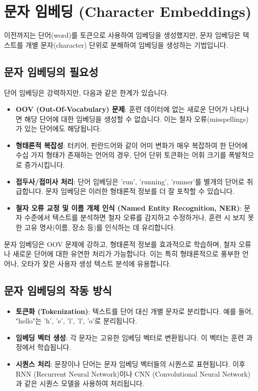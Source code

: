 \documentclass[11pt,a4paper]{article}
\begin{document}
\section{문자 임베딩 (Character Embeddings)}
이전까지는 단어(word)를 토큰으로 사용하여 임베딩을 생성했지만, 문자 임베딩은 텍스트를 개별 문자(character) 단위로 분해하여 임베딩을 생성하는 기법입니다.

\subsection{문자 임베딩의 필요성}
단어 임베딩은 강력하지만, 다음과 같은 한계가 있습니다.

\begin{itemize}
    \item \textbf{OOV (Out-Of-Vocabulary) 문제}: 훈련 데이터에 없는 새로운 단어가 나타나면 해당 단어에 대한 임베딩을 생성할 수 없습니다. 이는 철자 오류(misspellings)가 있는 단어에도 해당됩니다.
    \item \textbf{형태론적 복잡성}: 터키어, 핀란드어와 같이 어미 변화가 매우 복잡하여 한 단어에 수십 가지 형태가 존재하는 언어의 경우, 단어 단위 토큰화는 어휘 크기를 폭발적으로 증가시킵니다.
    \item \textbf{접두사/접미사 처리}: 단어 임베딩은 'run', 'running', 'runner'를 별개의 단어로 취급합니다. 문자 임베딩은 이러한 형태론적 정보를 더 잘 포착할 수 있습니다.
    \item \textbf{철자 오류 교정 및 이름 개체 인식 (Named Entity Recognition, NER)}: 문자 수준에서 텍스트를 분석하면 철자 오류를 감지하고 수정하거나, 훈련 시 보지 못한 고유 명사(이름, 장소 등)를 인식하는 데 유리합니다.
\end{itemize}

\begin{tcolorbox}[title=\textbf{문자 임베딩의 장점}]
문자 임베딩은 OOV 문제에 강하고, 형태론적 정보를 효과적으로 학습하며, 철자 오류나 새로운 단어에 대한 유연한 처리가 가능합니다. 이는 특히 형태론적으로 풍부한 언어나, 오타가 잦은 사용자 생성 텍스트 분석에 유용합니다.
\end{tcolorbox}

\subsection{문자 임베딩의 작동 방식}
\begin{itemize}
    \item \textbf{토큰화 (Tokenization)}: 텍스트를 단어 대신 개별 문자로 분리합니다. 예를 들어, "hello"는 'h', 'e', 'l', 'l', 'o'로 분리됩니다.
    \item \textbf{임베딩 벡터 생성}: 각 문자는 고유한 임베딩 벡터로 변환됩니다. 이 벡터는 훈련 과정에서 학습됩니다.
    \item \textbf{시퀀스 처리}: 문장이나 단어는 문자 임베딩 벡터들의 시퀀스로 표현됩니다. 이후 RNN (Recurrent Neural Network)이나 CNN (Convolutional Neural Network)과 같은 시퀀스 모델을 사용하여 처리됩니다.
\end{itemize}
\end{document}
